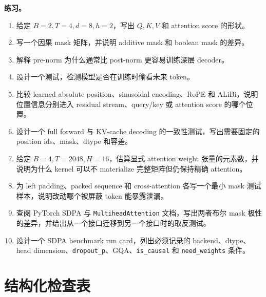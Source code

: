 \documentclass[UTF8,zihao=-4,openany]{ctexbook}
\begin{document}
\textbf{练习。}
\begin{enumerate}
\item 给定 $B=2,T=4,d=8,h=2$，写出 $Q,K,V$ 和 attention score 的形状。
\item 写一个因果 mask 矩阵，并说明 additive mask 和 boolean mask 的差异。
\item 解释 pre-norm 为什么通常比 post-norm 更容易训练深层 decoder。
\item 设计一个测试，检测模型是否在训练时偷看未来 token。
\item 比较 learned absolute position、sinusoidal encoding、RoPE 和 ALiBi，说明位置信息分别进入 residual stream、query/key 或 attention score 的哪个位置。
\item 设计一个 full forward 与 KV-cache decoding 的一致性测试，写出需要固定的 position ids、mask、dtype 和容差。
\item 给定 $B=4,T=2048,H=16$，估算显式 attention weight 张量的元素数，并说明为什么 kernel 可以不 materialize 完整矩阵但仍保持精确 attention。
\item 为 left padding、packed sequence 和 cross-attention 各写一个最小 mask 测试样本，说明改动哪个被屏蔽 token 能暴露泄漏。
\item 查阅 PyTorch SDPA 与 \texttt{MultiheadAttention} 文档，写出两者布尔 mask 极性的差异，并给出从一个接口迁移到另一个接口时的取反测试。
\item 设计一个 SDPA benchmark run card，列出必须记录的 backend、dtype、head dimension、\texttt{dropout\_p}、GQA、\texttt{is\_causal} 和 \texttt{need\_weights} 条件。
\end{enumerate}

\section{结构化检查表}
\end{document}
